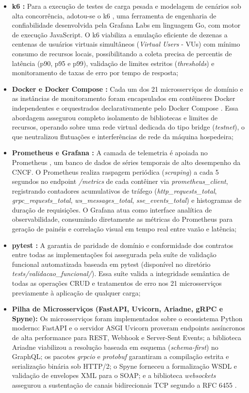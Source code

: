 \documentclass[a4paper,12pt]{article}
\begin{document}
\begin{itemize}
    \item \textbf{k6 \cite{k6}:} Para a execução de testes de carga pesada e modelagem de cenários sob alta concorrência, adotou-se o k6 \cite{k6}, uma ferramenta de engenharia de confiabilidade desenvolvida pela Grafana Labs em linguagem Go, com motor de execução JavaScript. O k6 viabiliza a emulação eficiente de dezenas a centenas de usuários virtuais simultâneos (\textit{Virtual Users} - VUs) com mínimo consumo de recursos locais, possibilitando a coleta precisa de percentis de latência (p90, p95 e p99), validação de limites estritos (\textit{thresholds}) e monitoramento de taxas de erro por tempo de resposta;
    \item \textbf{Docker e Docker Compose \cite{docker}:} Cada um dos 21 microsserviços de domínio e as instâncias de monitoramento foram encapsulados em contêineres Docker independentes e orquestrados declarativamente pelo Docker Compose \cite{docker}. Essa abordagem assegurou completo isolamento de bibliotecas e limites de recursos, operando sobre uma rede virtual dedicada do tipo bridge (\textit{testnet}), o que neutralizou flutuações e interferências de rede da máquina hospedeira;
    \item \textbf{Prometheus \cite{prometheus} e Grafana \cite{grafana}:} A camada de telemetria é apoiada no Prometheus \cite{prometheus}, um banco de dados de séries temporais de alto desempenho da CNCF. O Prometheus realiza raspagem periódica (\textit{scraping}) a cada 5 segundos no endpoint \textit{/metrics} de cada contêiner via \textit{prometheus\_client}, registrando contadores acumulativos de tráfego (\textit{http\_requests\_total}, \textit{grpc\_requests\_total}, \textit{ws\_messages\_total}, \textit{sse\_events\_total}) e histogramas de duração de requisições. O Grafana \cite{grafana} atua como interface analítica de observabilidade, consumindo diretamente as métricas do Prometheus para geração de painéis e correlação visual em tempo real entre vazão e latência;
    \item \textbf{pytest \cite{pytest}:} A garantia de paridade de domínio e conformidade dos contratos entre todas as implementações foi assegurada pela suíte de validação funcional automatizada baseada em pytest \cite{pytest} (disponível no diretório \textit{tests/validacao\_funcional/}). Essa suíte valida a integridade semântica de todas as operações CRUD e tratamentos de erro nos 21 microsserviços previamente à aplicação de qualquer carga;
    \item \textbf{Pilha de Microsserviços (FastAPI, Uvicorn, Ariadne, gRPC e Spyne):} Os microsserviços foram implementados sobre o ecossistema Python moderno: FastAPI e o servidor ASGI Uvicorn \cite{fastapi,uvicorn} proveram endpoints assíncronos de alta performance para REST, Webhook e Server-Sent Events; a biblioteca Ariadne \cite{ariadne} viabilizou a resolução baseada em esquema (\textit{schema-first}) no GraphQL; os pacotes \textit{grpcio} e \textit{protobuf} \cite{grpcio,protobuf} garantiram a compilação estrita e serialização binária sob HTTP/2; o Spyne forneceu a formalização WSDL e validação de envelopes XML para o SOAP; e a biblioteca \textit{websockets} assegurou a sustentação de canais bidirecionais TCP segundo a RFC 6455 \cite{rfc6455}.

\end{itemize}
\end{document}
